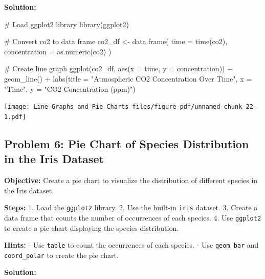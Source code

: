 \documentclass[
  letterpaper,
  DIV=11,
  numbers=noendperiod]{scrreprt}
\newenvironment{Shaded}{\begin{snugshade}}{\end{snugshade}}
\newcommand{\AttributeTok}[1]{\textcolor[rgb]{0.40,0.45,0.13}{#1}}
\newcommand{\CommentTok}[1]{\textcolor[rgb]{0.37,0.37,0.37}{#1}}
\newcommand{\FunctionTok}[1]{\textcolor[rgb]{0.28,0.35,0.67}{#1}}
\newcommand{\NormalTok}[1]{\textcolor[rgb]{0.00,0.23,0.31}{#1}}
\newcommand{\OtherTok}[1]{\textcolor[rgb]{0.00,0.23,0.31}{#1}}
\newcommand{\SpecialCharTok}[1]{\textcolor[rgb]{0.37,0.37,0.37}{#1}}
\newcommand{\StringTok}[1]{\textcolor[rgb]{0.13,0.47,0.30}{#1}}
\begin{document}
\textbf{Solution:}

\begin{Shaded}
\begin{Highlighting}[]
\CommentTok{\# Load ggplot2 library}
\FunctionTok{library}\NormalTok{(ggplot2)}

\CommentTok{\# Convert co2 to data frame}
\NormalTok{co2\_df }\OtherTok{\textless{}{-}} \FunctionTok{data.frame}\NormalTok{(}
  \AttributeTok{time =} \FunctionTok{time}\NormalTok{(co2),}
  \AttributeTok{concentration =} \FunctionTok{as.numeric}\NormalTok{(co2)}
\NormalTok{)}

\CommentTok{\# Create line graph}
\FunctionTok{ggplot}\NormalTok{(co2\_df, }\FunctionTok{aes}\NormalTok{(}\AttributeTok{x =}\NormalTok{ time, }\AttributeTok{y =}\NormalTok{ concentration)) }\SpecialCharTok{+}
  \FunctionTok{geom\_line}\NormalTok{() }\SpecialCharTok{+}
  \FunctionTok{labs}\NormalTok{(}\AttributeTok{title =} \StringTok{"Atmospheric CO2 Concentration Over Time"}\NormalTok{,}
       \AttributeTok{x =} \StringTok{"Time"}\NormalTok{,}
       \AttributeTok{y =} \StringTok{"CO2 Concentration (ppm)"}\NormalTok{)}
\end{Highlighting}
\end{Shaded}

\texttt{[image: Line\_Graphs\_and\_Pie\_Charts\_files/figure-pdf/unnamed-chunk-22-1.pdf]}

\subsection*{Problem 6: Pie Chart of Species Distribution in the Iris
Dataset}\label{problem-6-pie-chart-of-species-distribution-in-the-iris-dataset}

\textbf{Objective:} Create a pie chart to visualize the distribution of
different species in the Iris dataset.

\textbf{Steps:} 1. Load the \texttt{ggplot2} library. 2. Use the
built-in \texttt{iris} dataset. 3. Create a data frame that counts the
number of occurrences of each species. 4. Use \texttt{ggplot2} to create
a pie chart displaying the species distribution.

\textbf{Hints:} - Use \texttt{table} to count the occurrences of each
species. - Use \texttt{geom\_bar} and \texttt{coord\_polar} to create
the pie chart.

\textbf{Solution:}
\end{document}
